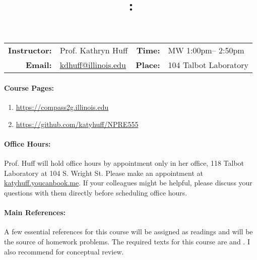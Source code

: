 \documentclass[11pt, a4paper]{article}
\title{\CourseNumber: \CourseTitle\\}
\author{\CourseUniversity}
\date{\CourseSemester \CourseYear}
\makeatletter
\newcommand{\CourseNumber}{NPRE555}
\newcommand{\CourseDays}{MW\xspace}%
\newcommand{\CourseStart}{1:00pm\xspace}%
\newcommand{\CourseEnd}{2:50pm\xspace}%
\newcommand{\CourseInstructor}{Prof. Kathryn Huff}
\newcommand{\CourseInstructorEmail}{kdhuff@illinois.edu}
\newcommand{\CourseRoom}{104\xspace}%
\newcommand{\CourseBuilding}{Talbot Laboratory\xspace}%
\newcommand{\TeachingAssistant}{TA Name\xspace}%
\newcommand{\TAOfficeHourDays}{Wednesdays\xspace}%
\newcommand{\TAOfficeHourStart}{1:00pm\xspace}%
\newcommand{\TAOfficeHourEnd}{3:00pm\xspace}%
\newcommand{\TAOfficeHourPlace}{123 Talbot Laboratory\xspace}
\makeatother
\begin{document}
\maketitle
\renewcommand{\arraystretch}{2}
\begin{center}
\begin{table}[h]
\begin{tabularx}{\textwidth}{rXrX}
\hline
\textbf{Instructor:} & \CourseInstructor & \textbf{Time:} & \CourseDays \CourseStart -- \CourseEnd \\
\textbf{Email:} &  \href{mailto:\CourseInstructorEmail}{\CourseInstructorEmail} & \textbf{Place:} & \CourseRoom \CourseBuilding\\
\hline
\end{tabularx}

\end{table}
\end{center}

\paragraph{Course Pages:}
\begin{enumerate}
        \item \url{https://compass2g.illinois.edu}
        \item \url{https://github.com/katyhuff/\CourseNumber}
\end{enumerate}


\paragraph{Office Hours:} Prof. Huff will hold office hours by appointment only
in her office, 118 Talbot Laboratory at 104 S. Wright St.  Please make an appointment at 
\url{katyhuff.youcanbook.me}. If your colleagues might be helpful, please 
discuss your questions with them directly before scheduling office hours.

\paragraph{Main References:}
A few essential references for this course will be assigned as readings and 
will be the source of homework problems. The required texts for this course are 
\cite{stacey_nuclear_2007} and \cite{bell_nuclear_1970}. I also recommend 
\cite{duderstadt_transport_1979} for conceptual review.

\renewcommand{\refname}{\normalfont\selectfont\normalsize}\vspace{-1cm}

\end{document}
